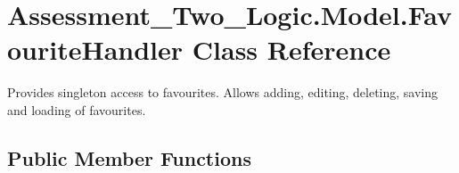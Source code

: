 \hypertarget{class_assessment___two___logic_1_1_model_1_1_favourite_handler}{
\section{Assessment\_\-Two\_\-Logic.Model.FavouriteHandler Class Reference}
\label{class_assessment___two___logic_1_1_model_1_1_favourite_handler}
}


Provides singleton access to favourites. Allows adding, editing, deleting, saving and loading of favourites.  


\subsection*{Public Member Functions}
